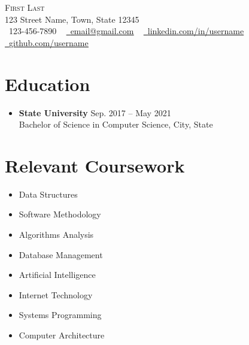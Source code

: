 \documentclass[letterpaper,5pt]{article}
\begin{document}
    

    
    \begin{center}
        {\Huge \scshape First Last} \\ \vspace{1pt}
        123 Street Name, Town, State 12345 \\ \vspace{1pt}
        \small \raisebox{-0.1\height}\faPhone\ 123-456-7890 ~ \href{mailto:x@gmail.com}{\raisebox{-0.2\height}\faEnvelope\ \underline{email@gmail.com}} ~ 
        \href{https://linkedin.com/in//}{\raisebox{-0.2\height}\faLinkedin\ \underline{linkedin.com/in/username}}  ~
        \href{https://github.com/}{\raisebox{-0.2\height}\faGithub\ \underline{github.com/username}}
        \vspace{-8pt}
    \end{center}
    
   \section{Education}
    \begin{itemize}[leftmargin=0.15in, label={}]
        \item
            \textbf{State University} \hfill Sep. 2017 -- May 2021 \\
            Bachelor of Science in Computer Science, City, State
    \end{itemize}
    
    \section{Relevant Coursework}
    \vspace*{-5mm}
           \begin{multicols}{4}
            \begin{itemize}[ itemsep=-5pt, parsep=3pt]
                \item\small Data Structures
                \item Software Methodology
                \item Algorithms Analysis
                \item Database Management
                \item Artificial Intelligence
                \item Internet Technology
                \item Systems Programming
                \item Computer Architecture
            \end{itemize}
        \end{multicols}  
    
\end{document}
